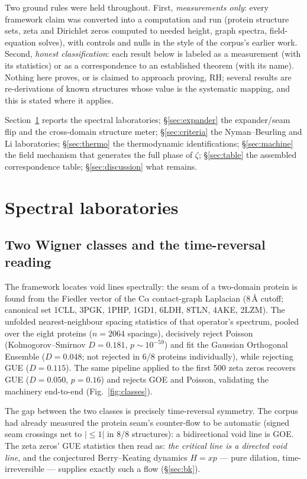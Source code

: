\documentclass[11pt]{article}
\begin{document}
Two ground rules were held throughout. First, \emph{measurements only}: every framework claim was
converted into a computation and run (protein structure sets, zeta and Dirichlet zeros computed to
needed height, graph spectra, field-equation solves), with controls and nulls in the style of the
corpus's earlier work. Second, \emph{honest classification}: each result below is labeled as a
measurement (with its statistics) or as a correspondence to an established theorem (with its name).
Nothing here proves, or is claimed to approach proving, RH; several results are re-derivations of
known structures whose value is the systematic mapping, and this is stated where it applies.

Section~\ref{sec:spectral} reports the spectral laboratories; \S\ref{sec:expander} the
expander/seam flip and the cross-domain structure meter; \S\ref{sec:criteria} the
Nyman--Beurling and Li laboratories; \S\ref{sec:thermo} the thermodynamic identifications;
\S\ref{sec:machine} the field mechanism that generates the full phase of $\zeta$;
\S\ref{sec:table} the assembled correspondence table; \S\ref{sec:discussion} what remains.

\section{Spectral laboratories}\label{sec:spectral}

\subsection{Two Wigner classes and the time-reversal reading}

The framework locates void lines spectrally: the seam of a two-domain protein is found from the
Fiedler vector of the C$\alpha$ contact-graph Laplacian (8\,\AA{} cutoff; canonical set 1CLL, 3PGK,
1PHP, 1GD1, 6LDH, 8TLN, 4AKE, 2LZM). The unfolded nearest-neighbour spacing statistics of that
operator's spectrum, pooled over the eight proteins ($n=2064$ spacings), decisively reject Poisson
(Kolmogorov--Smirnov $D=0.181$, $p\sim10^{-59}$) and fit the Gaussian Orthogonal Ensemble
($D=0.048$; not rejected in 6/8 proteins individually), while rejecting GUE ($D=0.115$). The same
pipeline applied to the first 500 zeta zeros recovers GUE ($D=0.050$, $p=0.16$) and rejects GOE and
Poisson, validating the machinery end-to-end (Fig.~\ref{fig:classes}).

The gap between the two classes is precisely time-reversal symmetry. The corpus had already measured
the protein seam's counter-flow to be automatic (signed seam crossings net to $|{\le}1|$ in 8/8
structures): a bidirectional void line is GOE. The zeta zeros' GUE statistics
\cite{montgomery,odlyzko} then read as: \emph{the critical line is a directed void line}, and the
conjectured Berry--Keating dynamics $H=xp$ \cite{berrykeating} --- pure dilation, time-irreversible
--- supplies exactly such a flow (\S\ref{sec:bk}).
\end{document}
